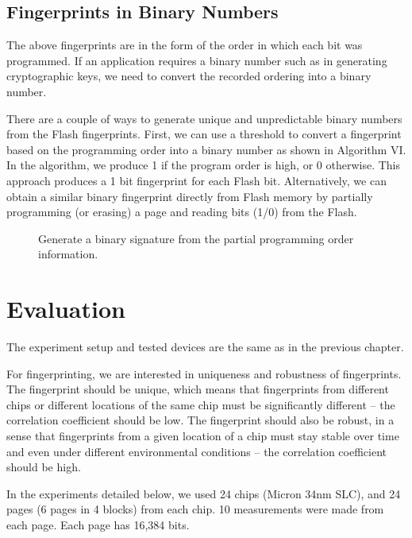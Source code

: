 \subsection{Fingerprints in Binary Numbers}

The above fingerprints are in the form of the order in which each bit was programmed. If an application requires a binary number such as in generating cryptographic keys, we need to convert the recorded ordering into a binary number.

There are a couple of ways to generate unique and unpredictable binary numbers from the Flash fingerprints. First, we can use a threshold to convert a fingerprint based on the programming order into a binary number as shown in Algorithm VI. In the algorithm, we produce 1 if the program order is high, or 0 otherwise. This approach produces a 1 bit fingerprint for each Flash bit. Alternatively, we can obtain a similar binary fingerprint directly from Flash memory by partially programming (or erasing) a page and reading bits (1/0) from the Flash.

\begin{figure} 
\begin{center} 
 
\caption{Generate a binary signature from the partial programming order information.}
\label{fig:gen_signature} 
\vspace{-0.25in}
\end{center} 
\end{figure}

\section{Evaluation}
 
The experiment setup and tested devices are the same as in the previous chapter. 

For fingerprinting, we are interested in uniqueness and robustness of fingerprints. The fingerprint should be unique, which means that fingerprints from different chips or different locations of the same chip must be significantly different – the correlation coefficient should be low. The fingerprint should also be robust, in a sense that fingerprints from a given location of a chip must stay stable over time and even under different environmental conditions – the correlation coefficient should be high.

In the experiments detailed below, we used 24 chips (Micron 34nm SLC), and 24 pages (6 pages in 4 blocks) from each chip. 10 measurements were made from each page. Each page has 16,384 bits.


